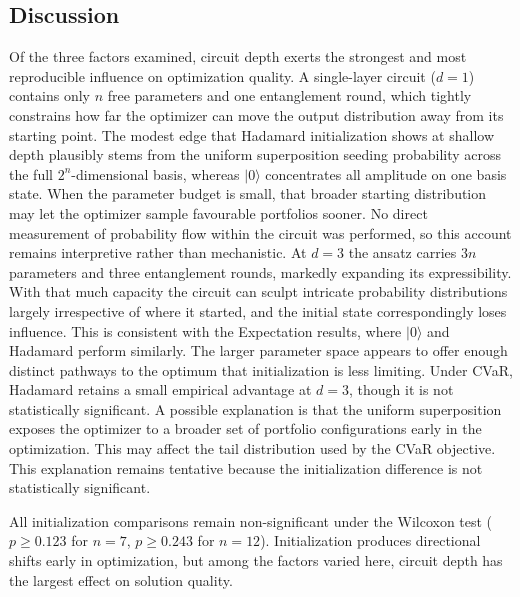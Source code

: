 \documentclass[runningheads]{llncs}
\begin{document}
\subsection{Discussion}

Of the three factors examined, circuit depth exerts the strongest and most reproducible influence on optimization quality. A single-layer circuit ($d = 1$) contains only $n$ free parameters and one entanglement round, which tightly constrains how far the optimizer can move the output distribution away from its starting point. The modest edge that Hadamard initialization shows at shallow depth plausibly stems from the uniform superposition seeding probability across the full $2^n$-dimensional basis, whereas $|0\rangle$ concentrates all amplitude on one basis state. When the parameter budget is small, that broader starting distribution may let the optimizer sample favourable portfolios sooner. No direct measurement of probability flow within the circuit was performed, so this account remains interpretive rather than mechanistic. At $d = 3$ the ansatz carries $3n$ parameters and three entanglement rounds, markedly expanding its expressibility. With that much capacity the circuit can sculpt intricate probability distributions largely irrespective of where it started, and the initial state correspondingly loses influence. This is consistent with the Expectation results, where $|0\rangle$ and Hadamard perform similarly. The larger parameter space appears to offer enough distinct pathways to the optimum that initialization is less limiting. Under CVaR, Hadamard retains a small empirical advantage at $d = 3$, though it is not statistically significant. A possible explanation is that the uniform superposition exposes the optimizer to a broader set of portfolio configurations early in the optimization. This may affect the tail distribution used by the CVaR objective. This explanation remains tentative because the initialization difference is not statistically significant.

All initialization comparisons remain non-significant under the Wilcoxon test ($p \geq 0.123$ for $n = 7$, $p \geq 0.243$ for $n = 12$). Initialization produces directional shifts early in optimization, but among the factors varied here, circuit depth has the largest effect on solution quality.
\end{document}
